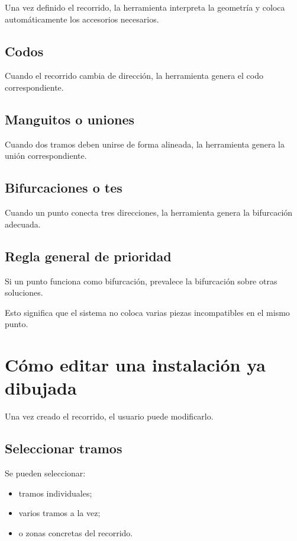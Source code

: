 Una vez definido el recorrido, la herramienta interpreta la geometría y coloca automáticamente los accesorios necesarios.

\subsection{Codos}

Cuando el recorrido cambia de dirección, la herramienta genera el codo correspondiente.

\subsection{Manguitos o uniones}

Cuando dos tramos deben unirse de forma alineada, la herramienta genera la unión correspondiente.

\subsection{Bifurcaciones o tes}

Cuando un punto conecta tres direcciones, la herramienta genera la bifurcación adecuada.

\subsection{Regla general de prioridad}

Si un punto funciona como bifurcación, prevalece la bifurcación sobre otras soluciones.

Esto significa que el sistema no coloca varias piezas incompatibles en el mismo punto.


\section{Cómo editar una instalación ya dibujada}

Una vez creado el recorrido, el usuario puede modificarlo.

\subsection{Seleccionar tramos}

Se pueden seleccionar:

\begin{itemize}
\item tramos individuales;
\item varios tramos a la vez;
\item o zonas concretas del recorrido.
\end{itemize}

